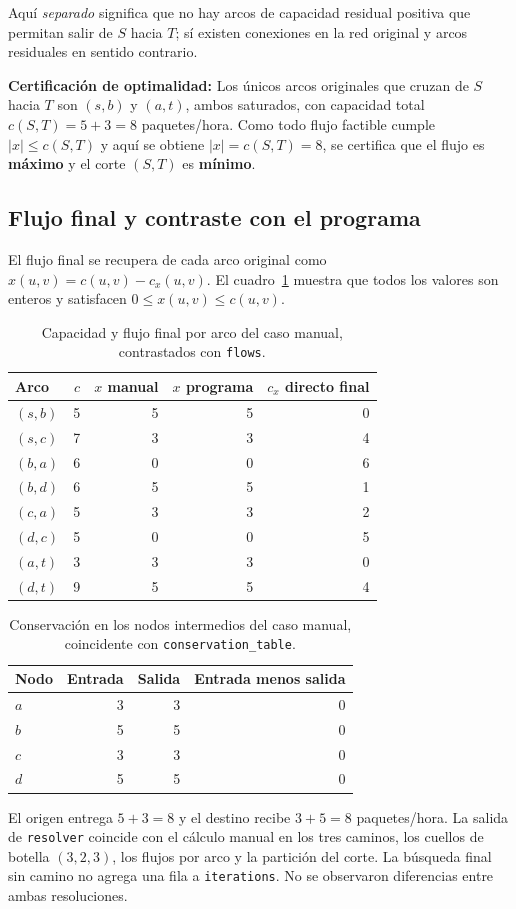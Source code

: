 \documentclass[12pt, a4paper]{article}
\begin{document}
Aquí \emph{separado} significa que no hay arcos de capacidad residual positiva que permitan salir de $S$ hacia $T$; sí existen conexiones en la red original y arcos residuales en sentido contrario.

\textbf{Certificación de optimalidad:} Los únicos arcos originales que cruzan de $S$ hacia $T$ son $(s,b)$ y $(a,t)$, ambos saturados, con capacidad total $c(S,T)=5+3=8$ \mbox{paquetes/hora}. Como todo flujo factible cumple $\lvert x\rvert\le c(S,T)$ y aquí se obtiene $\lvert x\rvert=c(S,T)=8$, se certifica que el flujo es \textbf{máximo} y el corte $(S,T)$ es \textbf{mínimo}.

\subsection{Flujo final y contraste con el programa}
El flujo final se recupera de cada arco original como $x(u,v)=c(u,v)-c_x(u,v)$. El cuadro~\ref{tab:manual_capacidad} muestra que todos los valores son enteros y satisfacen $0\le x(u,v)\le c(u,v)$.
\begin{table}[H]
  \centering
  \begin{tabular}{lrrrr}
    \toprule
    Arco & $c$ & $x$ manual & $x$ programa & $c_x$ directo final \\
    \midrule
    $(s,b)$ & 5 & 5 & 5 & 0 \\
    $(s,c)$ & 7 & 3 & 3 & 4 \\
    $(b,a)$ & 6 & 0 & 0 & 6 \\
    $(b,d)$ & 6 & 5 & 5 & 1 \\
    $(c,a)$ & 5 & 3 & 3 & 2 \\
    $(d,c)$ & 5 & 0 & 0 & 5 \\
    $(a,t)$ & 3 & 3 & 3 & 0 \\
    $(d,t)$ & 9 & 5 & 5 & 4 \\
    \bottomrule
  \end{tabular}
  \caption{Capacidad y flujo final por arco del caso manual, contrastados con \texttt{flows}.}
  \label{tab:manual_capacidad}
\end{table}

\begin{table}[H]
  \centering
  \begin{tabular}{lrrr}
    \toprule
    Nodo & Entrada & Salida & Entrada menos salida \\
    \midrule
    $a$ & 3 & 3 & 0 \\
    $b$ & 5 & 5 & 0 \\
    $c$ & 3 & 3 & 0 \\
    $d$ & 5 & 5 & 0 \\
    \bottomrule
  \end{tabular}
  \caption{Conservación en los nodos intermedios del caso manual, coincidente con \texttt{conservation\_table}.}
  \label{tab:manual_conservacion}
\end{table}
El origen entrega $5+3=8$ y el destino recibe $3+5=8$ \mbox{paquetes/hora}. La salida de \texttt{resolver} coincide con el cálculo manual en los tres caminos, los cuellos de botella $(3,2,3)$, los flujos por arco y la partición del corte. La búsqueda final sin camino no agrega una fila a \texttt{iterations}. No se observaron diferencias entre ambas resoluciones.
\end{document}
